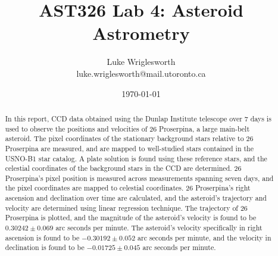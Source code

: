 \documentclass{article}
\title{AST326 Lab 4: Asteroid Astrometry}
\author{Luke Wriglesworth \\ \small luke.wriglesworth@mail.utoronto.ca}
\date{\today}
\begin{document}
\maketitle

\begin{abstract}
In this report, CCD data obtained using the Dunlap Institute telescope over 7 days is used to observe the positions and velocities of 26 Proserpina, a large main-belt asteroid. The pixel coordinates of the stationary background stars relative
to 26 Proserpina are measured, and are mapped to well-studied stars contained in the USNO-B1 star catalog. A plate solution is found using these reference stars, and the celestial coordinates of the background stars in the CCD are determined. 
26 Proserpina's pixel position is measured across measurements spanning seven days, and the pixel coordinates are mapped to celestial coordinates. 26 Proserpina's right ascension and declination over time are calculated, 
and the asteroid's trajectory and velocity are determined using linear regression technique. The trajectory of 26 Proserpina is plotted, and the magnitude of the asteroid's velocity is found to be $0.30242 \pm 0.069$ 
arc seconds per minute. The asteroid's velocity specifically in right ascension is found to be $-0.30192 \pm 0.052$ arc seconds per minute, and the velocity in declination is found to be $-0.01725 \pm 0.045$ arc seconds per minute.  
\end{abstract}
\end{document}
